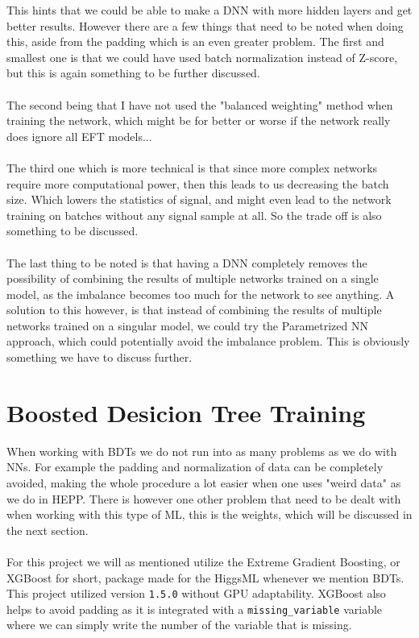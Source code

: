 \documentclass[14pt, a4paper]{book}
\begin{document}
\newpage\noindent This hints that we could be able to make a DNN with more hidden layers and get better results. However there are a few things that need to be noted when doing this, aside from the padding which is an even greater problem.
The first and smallest one is that we could have used batch normalization instead of Z-score, but this is again something to be further discussed.\\
\\The second being that I have not used the "balanced weighting" method when training the network, which might be for better or worse if the network really does ignore all EFT models...\\
\\The third one which is more technical is that since more complex networks require more computational power, then this leads to us decreasing the batch size. Which lowers the statistics of signal, 
and might even lead to the network training on batches without any signal sample at all. So the trade off is also something to be discussed.\\
\\The last thing to be noted is that having a DNN completely removes the possibility of combining the results of multiple networks trained on a single model, as the imbalance becomes too much for the network to see anything.
A solution to this however, is that instead of combining the results of multiple networks trained on a singular model, we could try the Parametrized NN approach, which could potentially avoid the imbalance problem.
This is obviously something we have to discuss further.
\clearpage
\graphicspath{{../../figures/}}






\section{Boosted Desicion Tree Training}
When working with BDTs we do not run into as many problems as we do with NNs. For example the padding and normalization of data can be completely avoided, making the whole procedure a lot easier when one uses "weird data" as we do in HEPP.
There is however one other problem that need to be dealt with when working with this type of ML, this is the weights, which will be discussed in the next section.\\
\\For this project we will as mentioned  utilize the Extreme Gradient Boosting, or XGBoost for short, package made for the HiggsML whenever we mention BDTs.
This project utilized version \verb|1.5.0| without GPU adaptability. XGBoost also helps to avoid padding as it is integrated with a \verb|missing_variable| variable where we can simply write the number of the variable that is missing.
\end{document}
